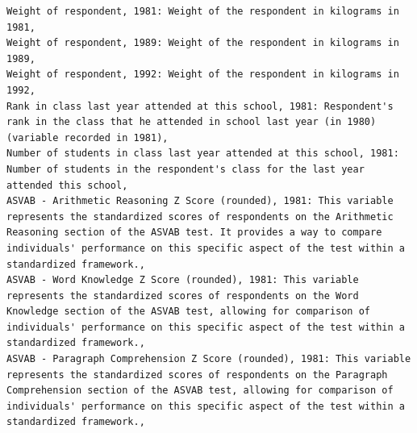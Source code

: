 \begin{verbatim}
Weight of respondent, 1981: Weight of the respondent in kilograms in 1981,
Weight of respondent, 1989: Weight of the respondent in kilograms in 1989,
Weight of respondent, 1992: Weight of the respondent in kilograms in 1992,
Rank in class last year attended at this school, 1981: Respondent's rank in the class that he attended in school last year (in 1980) (variable recorded in 1981),
Number of students in class last year attended at this school, 1981: Number of students in the respondent's class for the last year attended this school,
ASVAB - Arithmetic Reasoning Z Score (rounded), 1981: This variable represents the standardized scores of respondents on the Arithmetic Reasoning section of the ASVAB test. It provides a way to compare individuals' performance on this specific aspect of the test within a standardized framework.,
ASVAB - Word Knowledge Z Score (rounded), 1981: This variable represents the standardized scores of respondents on the Word Knowledge section of the ASVAB test, allowing for comparison of individuals' performance on this specific aspect of the test within a standardized framework.,
ASVAB - Paragraph Comprehension Z Score (rounded), 1981: This variable represents the standardized scores of respondents on the Paragraph Comprehension section of the ASVAB test, allowing for comparison of individuals' performance on this specific aspect of the test within a standardized framework.,


\end{verbatim}
